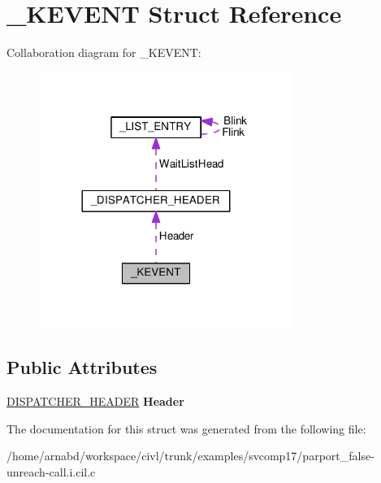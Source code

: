 \hypertarget{struct__KEVENT}{}\section{\+\_\+\+K\+E\+V\+E\+N\+T Struct Reference}
\label{struct__KEVENT}


Collaboration diagram for \+\_\+\+K\+E\+V\+E\+N\+T\+:
\nopagebreak
\begin{figure}[H]
\begin{center}
\leavevmode
\includegraphics[width=233pt]{struct__KEVENT__coll__graph}
\end{center}
\end{figure}
\subsection*{Public Attributes}
\begin{DoxyCompactItemize}
\item 
\hypertarget{struct__KEVENT_aa99c5efa0c0284542f781c384bc080b0}{}\hyperlink{struct__DISPATCHER__HEADER}{D\+I\+S\+P\+A\+T\+C\+H\+E\+R\+\_\+\+H\+E\+A\+D\+E\+R} {\bfseries Header}\label{struct__KEVENT_aa99c5efa0c0284542f781c384bc080b0}

\end{DoxyCompactItemize}


The documentation for this struct was generated from the following file\+:\begin{DoxyCompactItemize}
\item 
/home/arnabd/workspace/civl/trunk/examples/svcomp17/parport\+\_\+false-\/unreach-\/call.\+i.\+cil.\+c\end{DoxyCompactItemize}
